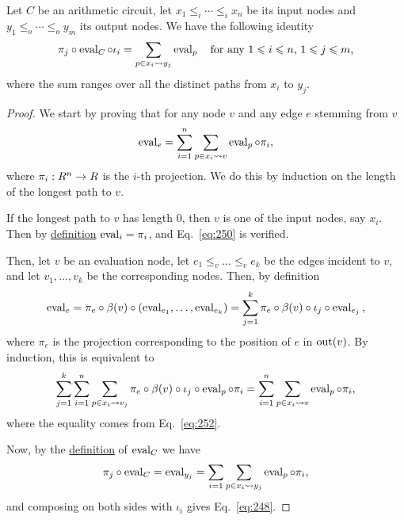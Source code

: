 \begin{lemma}
  \label{th:electrical-network}
  Let $C$ be an arithmetic circuit, let $x_1\le_i\cdots\le_ix_n$ be
  its input nodes and $y_1\le_o\cdots\le_oy_m$ its output nodes. 
  We have the following identity
  \begin{equation}
    \label{eq:248}
    \pi_j\circ\operatorname{eval}_C\circ\iota_i =
    \sum_{p\in x_i\leadsto y_j}\operatorname{eval}_p
    \quad\text{for any $1\leqslant i\leqslant n$, $1\leqslant j\leqslant m$,}
  \end{equation}
  where the sum ranges over all the distinct paths from $x_i$ to
  $y_j$.
\end{lemma}
\begin{proof}
  We start by proving that for any node $v$ and any edge $e$ stemming
  from $v$
  \begin{equation}
    \label{eq:250}
    \operatorname{eval}_{e} = \sum_{i=1}^n\sum_{p\in x_i\leadsto v}\operatorname{eval}_p\circ\pi_i
    \text{,}
  \end{equation}
  where $\pi_i:R^n\rightarrow R$ is the $i$-th projection. We do this by
  induction on the length of the longest path to $v$. 

  If the longest path to $v$ has length $0$, then $v$ is one of the
  input nodes, say $x_i$. Then by \hyperref[def:eval]{definition}
  $\operatorname{eval}_i=\pi_i$, and Eq.~\eqref{eq:250} is verified.

  Then, let $v$ be an evaluation node, let $e_1\le_v\ldots\le_ve_k$ be
  the edges incident to $v$, and let $v_1,\ldots,v_k$ be the
  corresponding nodes. Then, by definition
  \begin{equation}
    \label{eq:251}
    \operatorname{eval}_{e} = \pi_e\circ\beta(v)\circ(\operatorname{eval}_{e_1},\ldots,\operatorname{eval}_{e_k}) =
    \sum_{j=1}^k \pi_e\circ\beta(v)\circ\iota_j\circ\operatorname{eval}_{e_j}
    \text{,}
  \end{equation}
  where $\pi_e$ is the projection corresponding to the position of $e$
  in $\operatorname{out}(v)$. By induction, this is equivalent to
  \begin{equation}
    \label{eq:253}
    \sum_{j=1}^k\sum_{i=1}^n\sum_{p\in x_i\leadsto v_j} \pi_e\circ\beta(v)\circ\iota_j\circ\operatorname{eval}_p\circ\pi_i =
    \sum_{i=1}^n\sum_{p\in x_i\leadsto v}\operatorname{eval}_p\circ\pi_i
    \text{,}
  \end{equation}
  where the equality comes from Eq.~\eqref{eq:252}.

  Now, by the \hyperref[def:eval]{definition} of $\operatorname{eval}_C$ we have
  \begin{equation}
    \label{eq:254}
    \pi_j\circ\operatorname{eval}_C = \operatorname{eval}_{y_j} = \sum_{i=1}\sum_{p\in x_i\leadsto y_j}\operatorname{eval}_p\circ\pi_i
    \text{,}
  \end{equation}
  and composing on both sides with $\iota_i$ gives Eq.~\eqref{eq:248}.
\end{proof}


